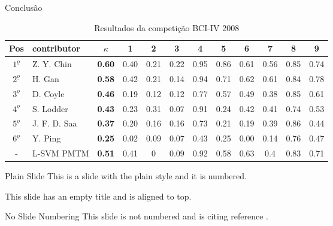 \documentclass{beamer}
\begin{document}
\begin{frame}{Conclus\~ao}
\color{BLACK}%
\begin{table}[h!]
	\centering
	\tiny
	\caption{Resultados da competi\c{c}\~ao BCI-IV 2008}
	\begin{tabularx}{\textwidth}{c|X|c|c|c|c|c|c|c|c|c|c}		
		\hline\hline
		Pos&contributor&$\kappa$&1&2&3&4&5&6&7&8&9  \\ \hline
		$1^{\underline{o}}$&Z. Y. Chin&\textbf{0.60}&0.40&0.21&0.22&	0.95&0.86&0.61&0.56&0.85&0.74 \\ \hline 
		$2^{\underline{o}}$&H. Gan&\textbf{0.58}&0.42&0.21&0.14&0.94&0.71 &0.62&0.61&0.84&0.78 \\ \hline
		$3^{\underline{o}}$&D. Coyle&\textbf{0.46}&0.19&0.12&0.12 &0.77&0.57&0.49&0.38&0.85&0.61 \\ \hline
		$4^{\underline{o}}$&S. Lodder&\textbf{0.43}&0.23&0.31&0.07&0.91& 	0.24&0.42&0.41&0.74&0.53 \\ \hline
		$5^{\underline{o}}$&J. F. D. Saa&\textbf{0.37}&0.20&0.16&0.16&0.73&0.21&0.19&0.39&0.86&0.44 \\ \hline
		$6^{\underline{o}}$&Y. Ping&\textbf{0.25}&0.02&0.09&0.07&0.43&0.25&0.00&0.14&0.76&0.47\\ \hline\hline
		-&L-SVM PMTM&\textbf{0.51}&0.41&0&0.09&0.92&0.58&0.63&0.4&0.83&0.71\\ \hline
	\end{tabularx}
	\label{Tab:BCI2008}
\end{table}
\end{frame}



\iffalse

\begin{frame}[plain]{Plain Slide}
	This is a slide with the plain style and it is numbered.
\end{frame}


\begin{frame}[t]
	This slide has an empty title and is aligned to top.
\end{frame}


\begin{frame}[noframenumbering]{No Slide Numbering}
	This slide is not numbered and is citing reference \cite{knuth74}.
\end{frame}
\end{document}
